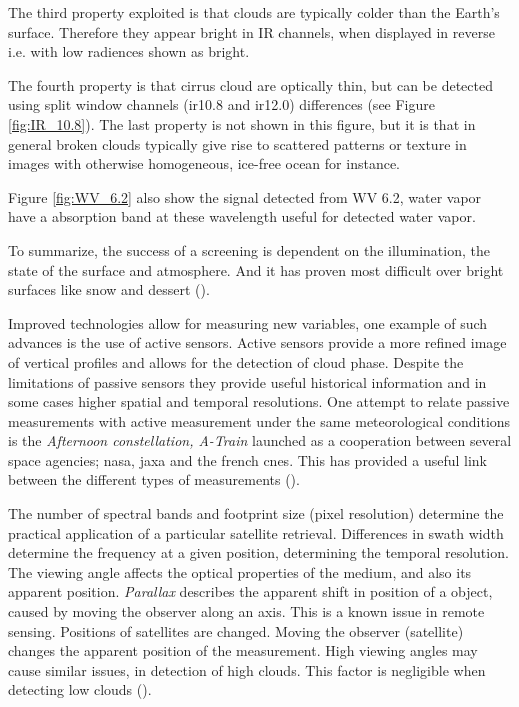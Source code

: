 The third property exploited is that clouds are typically colder than the Earth's surface. Therefore they appear bright in IR channels, when displayed in reverse i.e. with low radiences shown as bright. 

The fourth property is that cirrus cloud are optically thin, but can be detected using split window channels (\acrshort{ir}10.8 and \acrshort{ir}12.0) differences (see Figure \ref{fig:IR_10.8}). The last property is not shown in this figure, but it is that in general broken clouds typically give rise to scattered patterns or texture in images with otherwise homogeneous, ice-free ocean for instance. 

Figure \ref{fig:WV_6.2} also show the signal detected from WV 6.2, water  vapor have a absorption band at these wavelength useful for detected water vapor. 

To summarize, the success of a screening is dependent on the illumination, the state of the surface and atmosphere. And it has proven most difficult over bright surfaces like snow and dessert (\cite{Karlsson2015AdvancingData}). 

Improved technologies allow for measuring new variables, one example of such advances is the use of active sensors. Active sensors provide a more refined image of vertical profiles and allows for the detection of cloud phase. Despite the limitations of passive sensors they provide useful historical information and in some cases higher spatial and temporal resolutions. One attempt to relate passive measurements with active measurement under the same meteorological conditions is the \textit{Afternoon constellation, A-Train} launched as a cooperation between several space agencies; \acrfull{nasa}, \acrlong{jaxa} and the french \acrfull{cnes}. This has provided a useful link between the different types of measurements (\cite{Stephens2018CloudsatSystem}). 

The number of spectral bands and footprint size (pixel resolution) determine the practical application of a particular satellite retrieval. Differences in swath width determine the frequency at a given position, determining the temporal resolution. The viewing angle affects the optical properties of the medium, and also its apparent position. \textit{Parallax} describes the apparent shift in position of a object, caused by moving the observer along an axis. This is a known issue in remote sensing. Positions of satellites are changed. Moving the observer (satellite) changes the apparent position of the measurement. 
High viewing angles may cause similar issues, in detection of high clouds. This factor is negligible when detecting low clouds (\cite{Joro2010ComparisonFinland}). 

